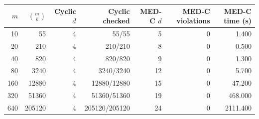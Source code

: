 \begin{tabular}{rrrrrrr}
\toprule
$m$ & $\binom{m}{k}$ & Cyclic $d$ & Cyclic checked & MED-C $d$ & MED-C violations & MED-C time (s) \\
\midrule
10 & 55 & 4 & 55/55 & 5 & 0 & 1.400 \\
20 & 210 & 4 & 210/210 & 8 & 0 & 0.500 \\
40 & 820 & 4 & 820/820 & 9 & 0 & 1.300 \\
80 & 3240 & 4 & 3240/3240 & 12 & 0 & 5.700 \\
160 & 12880 & 4 & 12880/12880 & 15 & 0 & 47.200 \\
320 & 51360 & 4 & 51360/51360 & 19 & 0 & 468.000 \\
640 & 205120 & 4 & 205120/205120 & 24 & 0 & 2111.400 \\
\bottomrule
\end{tabular}
